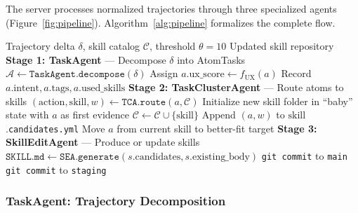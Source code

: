 \documentclass[11pt]{article}
\begin{document}
The server processes normalized trajectories through three specialized agents (Figure~\ref{fig:pipeline}). Algorithm~\ref{alg:pipeline} formalizes the complete flow.

\begin{algorithm}[t]
\caption{Three-Agent Skill Distillation Pipeline}
\label{alg:pipeline}
\begin{algorithmic}[1]
\REQUIRE Trajectory delta $\delta$, skill catalog $\mathcal{C}$, threshold $\theta = 10$
\ENSURE Updated skill repository
\STATE \textbf{Stage 1: TaskAgent} --- Decompose $\delta$ into AtomTasks
\STATE $\mathcal{A} \leftarrow \texttt{TaskAgent.decompose}(\delta)$ 
    \STATE Assign $a.\mathrm{ux\_score} \leftarrow f_{\mathrm{UX}}(a)$ 
    \STATE Record $a.\mathrm{intent}, a.\mathrm{tags}, a.\mathrm{used\_skills}$
\ENDFOR
\STATE
\STATE \textbf{Stage 2: TaskClusterAgent} --- Route atoms to skills
    \STATE $(\mathrm{action}, \mathrm{skill}, w) \leftarrow \texttt{TCA.route}(a, \mathcal{C})$
        \STATE Initialize new skill folder in ``baby'' state with $a$ as first evidence
        \STATE $\mathcal{C} \leftarrow \mathcal{C} \cup \{\mathrm{skill}\}$
        \STATE Append $(a, w)$ to $\mathrm{skill}$.\texttt{candidates.yml}
        \STATE Move $a$ from current skill to better-fit target
    \ENDIF
\ENDFOR
\STATE
\STATE \textbf{Stage 3: SkillEditAgent} --- Produce or update skills
        \STATE $\texttt{SKILL.md} \leftarrow \texttt{SEA.generate}(s.\mathrm{candidates}, s.\mathrm{existing\_body})$
            \STATE \texttt{git commit} to \texttt{main} 
        \ELSE
            \STATE \texttt{git commit} to \texttt{staging} 
        \ENDIF
    \ENDIF
\ENDFOR
\end{algorithmic}
\end{algorithm}

\subsubsection{TaskAgent: Trajectory Decomposition}
\end{document}
